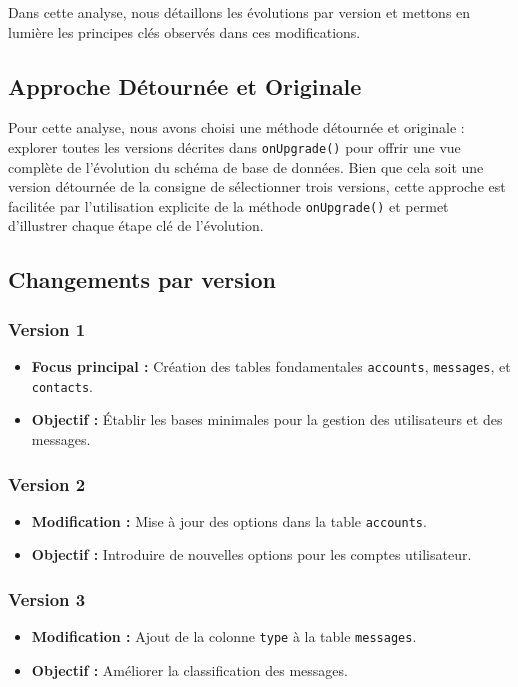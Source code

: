 \documentclass[a4paper,11pt]{article}
\begin{document}
Dans cette analyse, nous détaillons les évolutions par version et mettons en lumière les principes clés observés dans ces modifications.

\subsection*{Approche Détournée et Originale}

Pour cette analyse, nous avons choisi une méthode détournée et originale : explorer toutes les versions décrites dans \texttt{onUpgrade()} pour offrir une vue complète de l'évolution du schéma de base de données. Bien que cela soit une version détournée de la consigne de sélectionner trois versions, cette approche est facilitée par l'utilisation explicite de la méthode \texttt{onUpgrade()} et permet d'illustrer chaque étape clé de l'évolution.

\subsection*{Changements par version}


\subsubsection*{Version 1}
\begin{itemize}
    \item \textbf{Focus principal :} Création des tables fondamentales \texttt{accounts}, \texttt{messages}, et \texttt{contacts}.
    \item \textbf{Objectif :} Établir les bases minimales pour la gestion des utilisateurs et des messages.
\end{itemize}

\subsubsection*{Version 2}
\begin{itemize}
    \item \textbf{Modification :} Mise à jour des options dans la table \texttt{accounts}.
    \item \textbf{Objectif :} Introduire de nouvelles options pour les comptes utilisateur.
\end{itemize}

\subsubsection*{Version 3}
\begin{itemize}
    \item \textbf{Modification :} Ajout de la colonne \texttt{type} à la table \texttt{messages}.
    \item \textbf{Objectif :} Améliorer la classification des messages.
\end{itemize}
\end{document}
